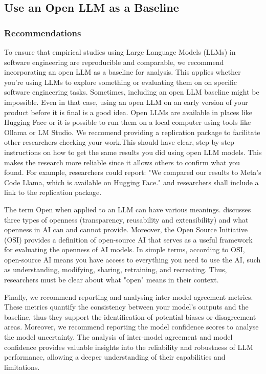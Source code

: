 



\subsection{Use an Open LLM as a Baseline}

\subsubsection{Recommendations}

To ensure that empirical studies using Large Language Models (LLMs) in software engineering are reproducible and comparable, 
we recommend incorporating an open LLM as a baseline for analysis. This applies whether you're using LLMs to explore something or evaluating them
on on specific software engineering tasks. 
Sometimes, including an open LLM baseline might be impossible. Even in that case, using an open LLM on an early version of your product before 
it is final is a good idea.
Open LLMs are available in places like Hugging Face or it is possible to run them on a local computer using tools like Ollama or LM Studio. 
We reccomend providing a replication package to facilitate other researchers checking your work.This should have clear, step-by-step instructions
on how to get the same results you did using open LLM models. This makes the research more reliable since it allows others to confirm what you found.
For example, researchers could report: "We compared our results to Meta's Code Llama, which is available on Hugging Face." and researchers shall include a link to the
 replication package.

The term Open when applied to an LLM can have various meanings. \cite{widder2024open} discusses three types of openness (transparency, reusability 
and extensibility) and  what openness in AI can and cannot provide. Moreover, the Open Source Initiative (OSI) \cite{OSIAI2024} provides a definition of 
open-source AI that serves as a useful framework for evaluating the openness of AI models. In simple terms, according to OSI, open-source AI means 
you have access to everything you need to use the AI, such as understanding, modifying, sharing, retraining, and recreating. Thus, researchers must 
be clear about what "open" means in their context.

Finally, we recommend reporting and analysing inter-model agreement metrics. These metrics quantify the consistency between your model's outputs 
and the baseline, thus they support the identification of potential biases or disagreement areas.  Moreover, we recommend reporting the model 
confidence scores to analyse the model uncertainty.  The analysis of inter-model agreement and model confidence provides valuable insights into 
the reliability and robustness of LLM performance, allowing a deeper understanding of their capabilities and limitations.


